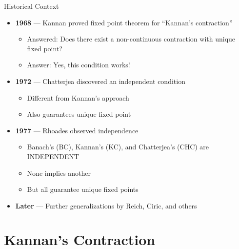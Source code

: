 \documentclass[aspectratio=169,10pt]{beamer}
\begin{document}
\begin{frame}{Historical Context}
    \begin{itemize}
        \item \textbf{1968} --- Kannan proved fixed point theorem for ``Kannan's contraction''
        \begin{itemize}
            \item Answered: Does there exist a non-continuous contraction with unique fixed point?
            \item Answer: Yes, this condition works!
        \end{itemize}

        \item \textbf{1972} --- Chatterjea discovered an independent condition
        \begin{itemize}
            \item Different from Kannan's approach
            \item Also guarantees unique fixed point
        \end{itemize}

        \item \textbf{1977} --- Rhoades observed independence
        \begin{itemize}
            \item Banach's (BC), Kannan's (KC), and Chatterjea's (CHC) are INDEPENDENT
            \item None implies another
            \item But all guarantee unique fixed points
        \end{itemize}

        \item \textbf{Later} --- Further generalizations by Reich, Ciric, and others
    \end{itemize}
\end{frame}

\section{Kannan's Contraction}
\end{document}
